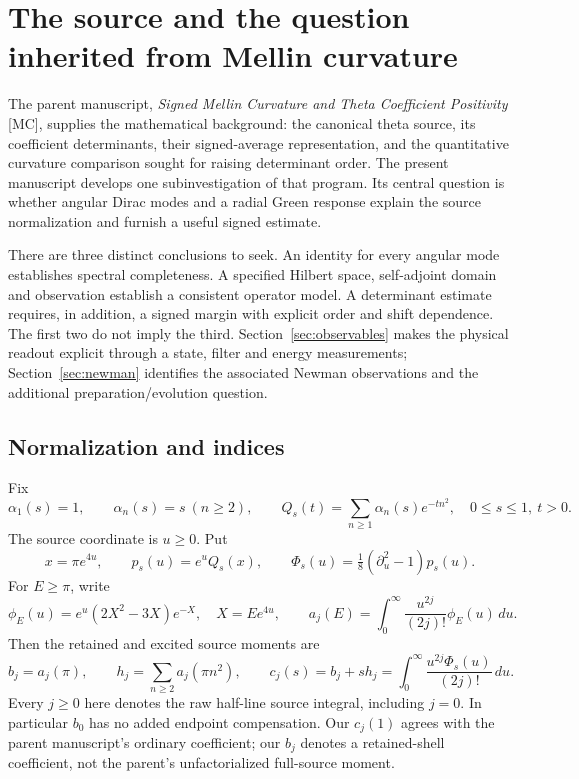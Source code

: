 \documentclass[11pt,letterpaper]{article}
\numberwithin{equation}{section}
\theoremstyle{remark}
\newcommand{\dd}{\,d}
\newcommand{\evid}[1]{\textsf{[#1]}}
\begin{document}
\clearpage
\tableofcontents
\bigskip

\section{The source and the question inherited from Mellin curvature}
\label{sec:setup}

The parent manuscript, \emph{Signed Mellin Curvature and Theta Coefficient
Positivity} \evid{MC}, supplies the mathematical background: the canonical
theta source, its coefficient determinants, their signed-average
representation, and the quantitative curvature comparison sought for
raising determinant order. The present manuscript develops one
subinvestigation of that program. Its central question is whether
angular Dirac modes and a radial Green response explain the source
normalization and furnish a useful signed estimate.

There are three distinct conclusions to seek. An identity for every
angular mode establishes spectral completeness. A specified Hilbert
space, self-adjoint domain and observation establish a consistent
operator model. A determinant estimate requires, in addition, a signed
margin with explicit order and shift dependence. The first two do not
imply the third. Section~\ref{sec:observables} makes the physical
readout explicit through a state, filter and energy measurements;
Section~\ref{sec:newman} identifies the associated Newman observations
and the additional preparation/evolution question.

\subsection{Normalization and indices}

Fix
\begin{equation}
 \alpha_1(s)=1,\qquad \alpha_n(s)=s\ (n\ge2),\qquad
 Q_s(t)=\sum_{n\ge1}\alpha_n(s)e^{-tn^2},\quad 0\le s\le1,\ t>0.
 \label{eq:filter}
\end{equation}
The source coordinate is \(u\ge0\). Put
\begin{equation}
 x=\pi e^{4u},\qquad
 p_s(u)=e^uQ_s(x),\qquad
 \Phi_s(u)=\tfrac18(\partial_u^2-1)p_s(u).
 \label{eq:source-map}
\end{equation}
For \(E\ge\pi\), write
\begin{equation}
 \phi_E(u)=e^u(2X^2-3X)e^{-X},\quad X=Ee^{4u},\qquad
 a_j(E)=\int_0^\infty\frac{u^{2j}}{(2j)!}\phi_E(u)\dd u.
 \label{eq:single-source}
\end{equation}
Then the retained and excited source moments are
\begin{equation}
 b_j=a_j(\pi),\qquad h_j=\sum_{n\ge2}a_j(\pi n^2),\qquad
 c_j(s)=b_j+s h_j=\int_0^\infty\frac{u^{2j}\Phi_s(u)}{(2j)!}\dd u.
 \label{eq:moments}
\end{equation}
Every \(j\ge0\) here denotes the raw half-line source integral, including
\(j=0\). In particular \(b_0\) has no added endpoint compensation.
Our \(c_j(1)\) agrees with the parent manuscript's ordinary coefficient;
our \(b_j\) denotes a retained-shell coefficient, not the parent's
unfactorialized full-source moment.
\end{document}
